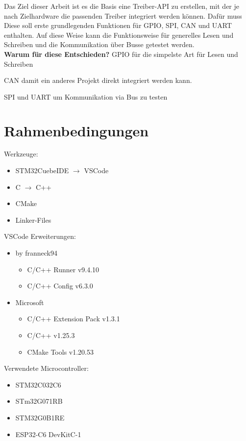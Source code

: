 Das Ziel dieser Arbeit ist es die Basis eine Treiber-API zu erstellen, mit der je nach Zielhardware die passenden Treiber integriert werden können.
Dafür muss 
Diese soll erste grundlegenden Funktionen für GPIO, SPI, CAN und UART enthalten. 
Auf diese Weise kann die Funktionsweise für generelles Lesen und Schreiben und die Kommunikation über Busse getestet werden.
\\

\textbf{Warum für diese Entschieden?}
GPIO für die simpelste Art für Lesen und Schreiben

CAN damit ein anderes Projekt direkt integriert werden kann.


SPI und UART um Kommunikation via Bus zu testen




\section{Rahmenbedingungen}
Werkzeuge:
\begin{itemize}
	\item STM32CuebeIDE $\rightarrow$ VSCode
	\item C $\rightarrow$ C++
	\item CMake
	\item Linker-Files
\end{itemize}

VSCode Erweiterungen:
\begin{itemize}
	\item by franneck94
	\begin{itemize}
		\item C/C++ Runner v9.4.10
		\item C/C++ Config v6.3.0
	\end{itemize}
	\item Microsoft
	\begin{itemize}
		\item C/C++ Extension Pack v1.3.1
		\item C/C++ v1.25.3
		\item CMake Tools v1.20.53
	\end{itemize}
\end{itemize}

Verwendete Microcontroller:
\begin{itemize}
	\item STM32C032C6
	\item STm32G071RB
	\item STM32G0B1RE
	\item ESP32-C6 DevKitC-1
\end{itemize}


